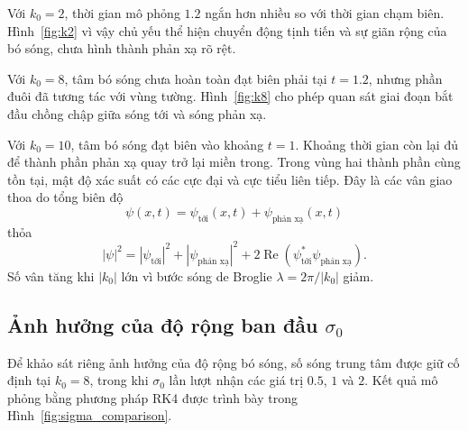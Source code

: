 \documentclass[12pt,a4paper]{article}
\begin{document}
Với $k_0=2$, thời gian mô phỏng $1.2$ ngắn hơn nhiều so với thời gian chạm biên. Hình~\ref{fig:k2} vì vậy chủ yếu thể hiện chuyển động tịnh tiến và sự giãn rộng của bó sóng, chưa hình thành phản xạ rõ rệt.

Với $k_0=8$, tâm bó sóng chưa hoàn toàn đạt biên phải tại $t=1.2$, nhưng phần đuôi đã tương tác với vùng tường. Hình~\ref{fig:k8} cho phép quan sát giai đoạn bắt đầu chồng chập giữa sóng tới và sóng phản xạ.

Với $k_0=10$, tâm bó sóng đạt biên vào khoảng $t=1$. Khoảng thời gian còn lại đủ để thành phần phản xạ quay trở lại miền trong. Trong vùng hai thành phần cùng tồn tại, mật độ xác suất có các cực đại và cực tiểu liên tiếp. Đây là các vân giao thoa do tổng biên độ
\begin{equation}
    \psi(x,t)=\psi_{\text{tới}}(x,t)+\psi_{\text{phản xạ}}(x,t)
\end{equation}
thỏa
\begin{equation}
    |\psi|^2=|\psi_{\text{tới}}|^2+|\psi_{\text{phản xạ}}|^2
    +2\operatorname{Re}\!\left(\psi_{\text{tới}}^*\psi_{\text{phản xạ}}\right).
\end{equation}
Số vân tăng khi $|k_0|$ lớn vì bước sóng de Broglie $\lambda=2\pi/|k_0|$ giảm.

\subsection{Ảnh hưởng của độ rộng ban đầu $\sigma_0$}

Để khảo sát riêng ảnh hưởng của độ rộng bó sóng, số sóng trung tâm được giữ cố định tại
$k_0=8$, trong khi $\sigma_0$ lần lượt nhận các giá trị $0.5$, $1$ và $2$.
Kết quả mô phỏng bằng phương pháp RK4 được trình bày trong
Hình~\ref{fig:sigma_comparison}.
\end{document}

